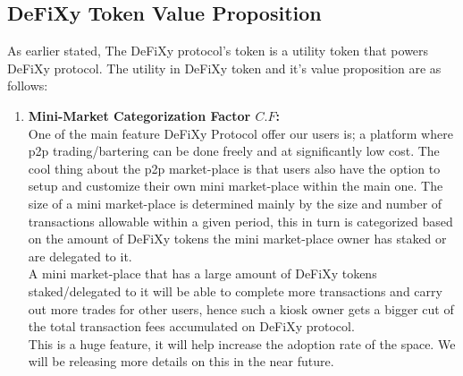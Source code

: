 \documentclass[12pt,onecolumn,letterpaper]{article} %
\begin{document}
  \subsection{DeFiXy Token Value Proposition}
  As earlier stated, The DeFiXy protocol's token is a utility token that powers DeFiXy protocol. The utility in DeFiXy token and it's value proposition are as follows:
  \begin{enumerate}
    \item \textbf{Mini-Market Categorization Factor $C.F$:}\\
One of the main feature DeFiXy Protocol offer our users is; a platform where p2p trading/bartering can be done freely and at significantly low cost. The cool thing about the p2p market-place is that users also have the option to setup and customize their own mini market-place within the main one. The size of a mini market-place is determined mainly by the size and number of transactions allowable within a given period, this in turn is categorized based on the amount of DeFiXy tokens the mini market-place owner has staked or are delegated to it. \\
A mini market-place that has a large amount of DeFiXy tokens staked/delegated to it will be able to complete more transactions and carry out more trades for other users, hence such a kiosk owner gets a bigger cut of the total transaction fees accumulated on DeFiXy protocol.\\
This is a huge feature, it will help increase the adoption rate of the space. We will be releasing more details on this in the near future.


\end{enumerate}
\end{document}
